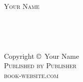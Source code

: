 \documentclass[11pt, %
               oneside] %
               {book}
\begin{document}
\renewcommand{\mkbibnamefirst}[1]{\textsc{#1}}
\renewcommand{\mkbibnamelast}[1]{\textsc{#1}}
\renewcommand{\mkbibnameprefix}[1]{\textsc{#1}}
\renewcommand{\mkbibnameaffix}[1]{\textsc{#1}}

\cleardoublepage %

\graphicspath{ {./Images/}}


\thispagestyle{empty}

\begin{center}
    \vspace*{1cm}
    
    \textsc{\huge\sffamily Your Name}
    
    \vspace*{3cm}
    
    \textsc{\textbf{\huge{}}}

    \vspace*{2cm}
    
    \textsc{\textbf{\huge{}}} 
   
    \vspace*{10.6cm}


    \large{\\
    \sffamily{\the\year}}
\end{center}



\iffalse
\newpage
~\vfill
\thispagestyle{empty}

\noindent Copyright \copyright\ \the\year Your Name\\ %

\noindent \textsc{Published by Publisher}\\ %

\noindent \textsc{book-website.com}\\ %
\end{document}
